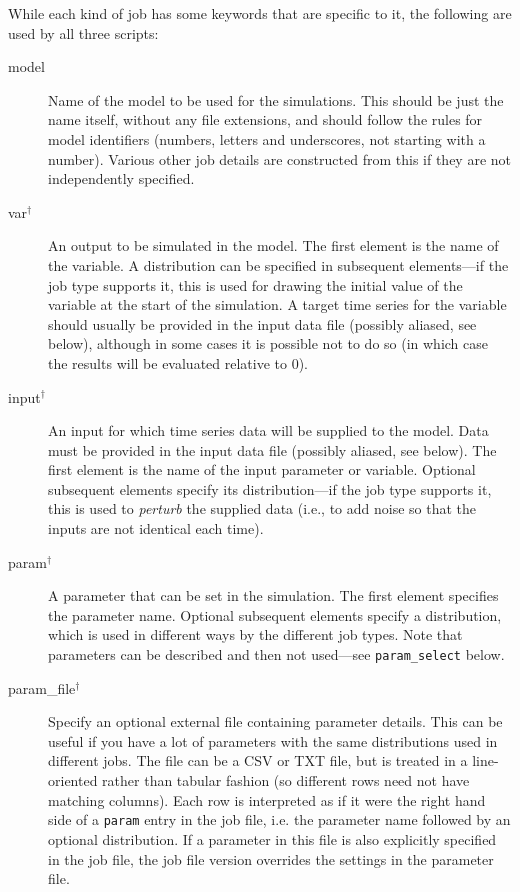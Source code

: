 \documentclass[a4paper,11pt]{article}
\begin{document}
While each kind of job has some keywords that are specific to it, the following are used by all three scripts:

\begin{adjustwidth}{0.8cm}{0.8cm}
\begin{description}
\item[model] Name of the model to be used for the simulations. This should be just the name itself, without any file extensions, and should follow the rules for model identifiers (numbers, letters and underscores, not starting with a number). Various other job details are constructed from this if they are not independently specified.
\item[var$^{\dagger}$] An output to be simulated in the model. The first element is the name of the variable. A distribution can be specified in subsequent elements---if the job type supports it, this is used for drawing the initial value of the variable at the start of the simulation. A target time series for the variable should usually be provided in the input data file (possibly aliased, see below), although in some cases it is possible not to do so (in which case the results will be evaluated relative to 0).
\item[input$^{\dagger}$] An input for which time series data will be supplied to the model. Data must be provided in the input data file (possibly aliased, see below). The first element is the name of the input parameter or variable. Optional subsequent elements specify its distribution---if the job type supports it, this is used to \textit{perturb} the supplied data (i.e., to add noise so that the inputs are not identical each time).
\item[param$^{\dagger}$] A parameter that can be set in the simulation. The first element specifies the parameter name. Optional subsequent elements specify a distribution, which is used in different ways by the different job types. Note that parameters can be described and then not used---see \texttt{param\_select} below.
\item[param\_file$^{\dagger}$] Specify an optional external file containing parameter details. This can be useful if you have a lot of parameters with the same distributions used in different jobs. The file can be a CSV or TXT file, but is treated in a line-oriented rather than tabular fashion (so different rows need not have matching columns). Each row is interpreted as if it were the right hand side of a \texttt{param} entry in the job file, i.e. the parameter name followed by an optional distribution. If a parameter in this file is also explicitly specified in the job file, the job file version overrides the settings in the parameter file.

\end{description}
\end{adjustwidth}
\end{document}
